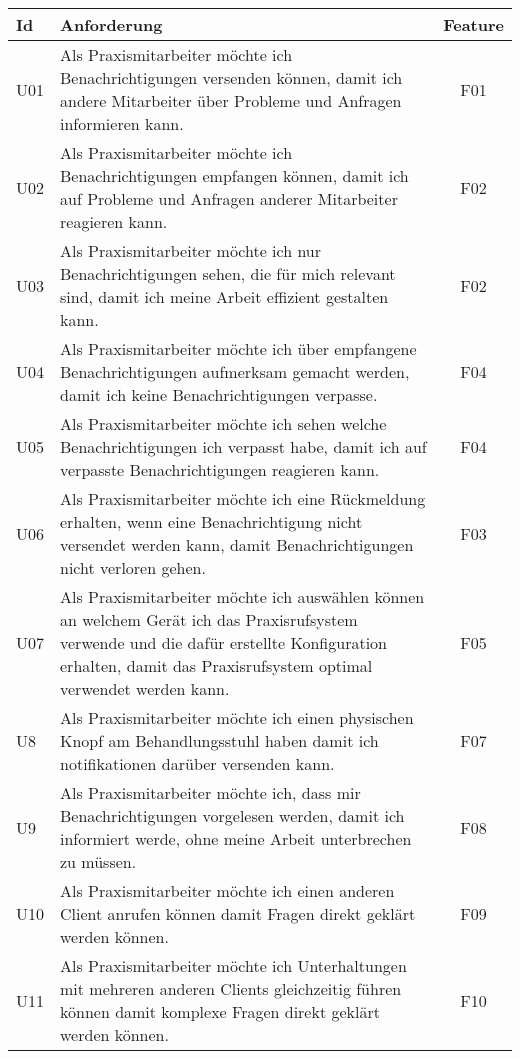 \begin{table}[h]
    \centering
    \begin{tabular}{|l|p{13cm}|c|}
        \hline
        \textbf{Id} & \textbf{Anforderung}                                                                                                                                      & \textbf{Feature} \\
        \hline
        U01         & Als Praxismitarbeiter möchte ich Benachrichtigungen versenden können, damit ich andere Mitarbeiter über Probleme und Anfragen informieren kann. & F01 \\
        \hline
        U02         & Als Praxismitarbeiter möchte ich Benachrichtigungen empfangen können, damit ich auf Probleme und Anfragen anderer Mitarbeiter reagieren kann. & F02 \\
        \hline
        U03         & Als Praxismitarbeiter möchte ich nur Benachrichtigungen sehen, die für mich relevant sind, damit ich meine Arbeit effizient gestalten kann. & F02 \\
        \hline
        U04         & Als Praxismitarbeiter möchte ich über empfangene Benachrichtigungen aufmerksam gemacht werden, damit ich keine Benachrichtigungen verpasse. & F04 \\
        \hline
        U05         & Als Praxismitarbeiter möchte ich sehen welche Benachrichtigungen ich verpasst habe, damit ich auf verpasste Benachrichtigungen reagieren kann. & F04 \\
        \hline
        U06         & Als Praxismitarbeiter möchte ich eine Rückmeldung erhalten, wenn eine Benachrichtigung nicht versendet werden kann, damit Benachrichtigungen nicht verloren gehen. & F03 \\
        \hline
        U07         & Als Praxismitarbeiter möchte ich auswählen können an welchem Gerät ich das Praxisrufsystem verwende und die dafür erstellte Konfiguration erhalten, damit das Praxisrufsystem optimal verwendet werden kann. & F05 \\
        \hline
        U8          & Als Praxismitarbeiter möchte ich einen physischen Knopf am Behandlungsstuhl haben damit ich notifikationen darüber versenden kann. & F07 \\
        \hline
        U9          & Als Praxismitarbeiter möchte ich, dass mir Benachrichtigungen vorgelesen werden, damit ich informiert werde, ohne meine Arbeit unterbrechen zu müssen. & F08 \\
        \hline
        U10          & Als Praxismitarbeiter möchte ich einen anderen Client anrufen können damit Fragen direkt geklärt werden können. & F09 \\
        \hline
        U11         & Als Praxismitarbeiter möchte ich Unterhaltungen mit mehreren anderen Clients gleichzeitig führen können damit komplexe Fragen direkt geklärt werden können. & F10 \\
        \hline
    \end{tabular}\label{tab:userstories1}
\end{table}

